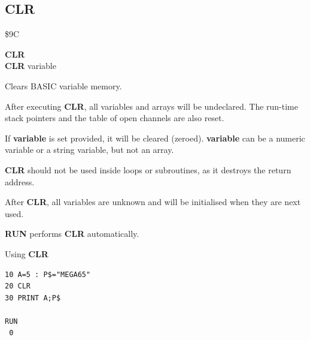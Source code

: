 \subsection{CLR}
\begin{description}[leftmargin=2cm,style=nextline]
\item [Token:]   \$9C

\item [Format:]  {\bf CLR} \\
                 {\bf CLR} variable

\item [Usage:]   Clears BASIC variable memory.

                 After executing {\bf CLR}, all variables and arrays will be undeclared. The run-time stack pointers and the table of open channels are also reset.
                 
                 If {\bf variable} is set provided, it will be cleared (zeroed). {\bf variable} can be a numeric variable or a string variable, but not an array.

\item [Remarks:] {\bf CLR} should not be used inside loops or subroutines, as it destroys the return address.
               
                 After {\bf CLR}, all variables are unknown and will be initialised when they are next used.

                 {\bf RUN} performs {\bf CLR} automatically.

\item [Example:] Using {\bf CLR}

\begin{tcolorbox}[colback=black,coltext=white]
\verbatimfont{\codefont}
\begin{verbatim}
10 A=5 : P$="MEGA65"
20 CLR
30 PRINT A;P$

RUN
 0
\end{verbatim}
\end{tcolorbox}
\end{description}


\newpage
